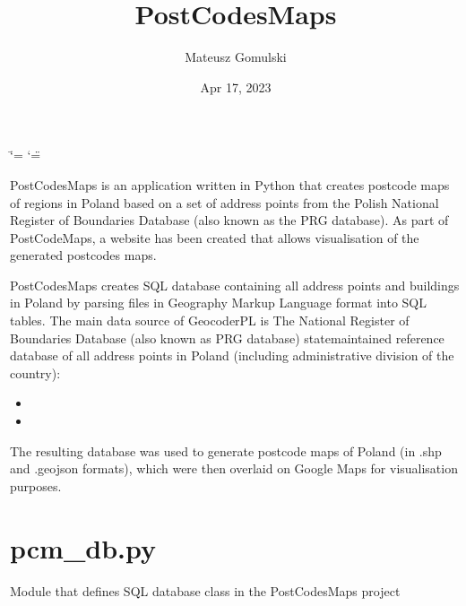 \documentclass[letterpaper,10pt,english]{sphinxmanual}
\title{PostCodesMaps}
\date{Apr 17, 2023}
\author{Mateusz Gomulski}
\begin{document}
\ifdefined\shorthandoff
  \ifnum\catcode`\=\string=\active\shorthandoff{=}\fi
  \ifnum\catcode`\"=\active{}\fi
\fi

\pagestyle{empty}
\sphinxmaketitle
\pagestyle{plain}
\sphinxtableofcontents
\pagestyle{normal}
\label{\detokenize{index::doc}}


\sphinxAtStartPar
PostCodesMaps is an application written in Python that creates postcode maps of regions in Poland based on a set of address points from the Polish National Register of Boundaries Database (also known as the PRG database). As part of PostCodeMaps, a website has been created that allows visualisation of the generated postcodes maps.

\sphinxAtStartPar
PostCodesMaps creates SQL database containing all address points and buildings in Poland by parsing files in Geography Markup Language format into SQL tables. The main data source of GeocoderPL is The National Register of Boundaries Database (also known as PRG database) \sphinxhyphen{} state\sphinxhyphen{}maintained reference database of all address points in Poland (including administrative division of the country):
\begin{itemize}
\item {} 
\sphinxAtStartPar
{}

\item {} 
\sphinxAtStartPar
{}

\end{itemize}

\sphinxAtStartPar
The resulting database was used to generate postcode maps of Poland (in .shp and .geojson formats), which were then overlaid on Google Maps for visualisation purposes.

\sphinxstepscope


\chapter{pcm\_db.py}
\label{\detokenize{pcm_db:module-pcm_db}}\label{\detokenize{pcm_db:pcm-db-py}}\label{\detokenize{pcm_db::doc}}
\sphinxAtStartPar
Module that defines SQL database class in the PostCodesMaps project
\end{document}
